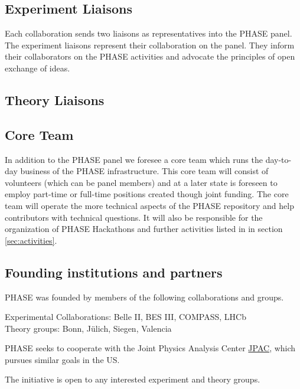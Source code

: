 \subsection{Experiment Liaisons}
Each collaboration sends two liaisons as representatives into the PHASE panel. The experiment liaisons represent their collaboration on the panel. They inform their collaborators on the PHASE activities and advocate the principles of open exchange of ideas. 

\subsection{Theory Liaisons}

\subsection{Core Team}
In addition to the PHASE panel we foresee a core team which runs the day-to-day business of the PHASE infrastructure. This core team will consist of volunteers (which can be panel members) and at a later state is foreseen to employ part-time or full-time positions created though joint funding. The core team will operate the more technical aspects of the PHASE repository and help contributors with technical questions. It will also be responsible for the organization of PHASE Hackathons and further activities listed in in section \ref{sec:activities}.

\subsection{Founding institutions and partners}
PHASE was founded by members of the following collaborations and groups.

Experimental Collaborations: Belle II, BES III, COMPASS, LHCb \\
Theory groups: Bonn, J\"ulich, Siegen, Valencia

PHASE seeks to cooperate with the Joint Physics Analysis Center \href{https://jpac.jlab.org/}{JPAC}, which pursues similar goals in the US.

The initiative is open to any interested experiment and theory groups.